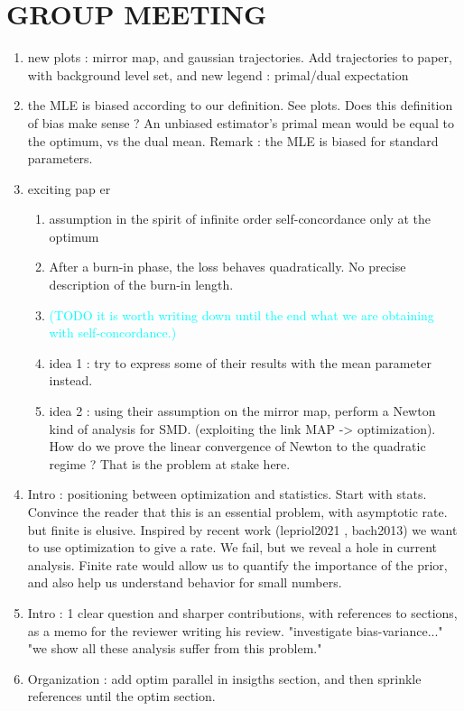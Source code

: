 \documentclass[twoside]{article}
\let\oldsection\section
\renewcommand{\section}[1]{\oldsection{\texorpdfstring{\uppercase{#1}}{#1}}}
\newcommand{\TODO}[1]{\textcolor{cyan}{(TODO #1)}}
\begin{document}
\section{Group Meeting}
\begin{enumerate}
	\item new plots : mirror map, and gaussian trajectories. Add trajectories to paper, with background level set, and new legend : primal/dual expectation
	\item the MLE is biased according to our definition. See plots. Does this definition of bias make sense ? An unbiased estimator's primal mean would be equal to the optimum, vs the dual mean.  Remark : the MLE is biased for standard parameters.
	\item exciting pap er\citet{kakade2010learning}
	\begin{enumerate}
		\item assumption in the spirit of infinite order self-concordance only at the optimum
		\item After a burn-in phase, the loss behaves quadratically. No precise description of the burn-in length.
		\item \TODO{it is worth writing down until the end what we are obtaining with self-concordance.}
		\item idea 1 : try to express some of their results with the mean parameter instead.
		\item idea 2 : using their assumption on the mirror map, perform a Newton kind of analysis for SMD. (exploiting the link MAP -> optimization). How do we prove the linear convergence of Newton to the quadratic regime ? That is the problem at stake here.
	\end{enumerate}
	\item Intro : positioning between optimization and statistics. Start with stats. Convince the reader that this is an essential problem, with asymptotic rate. but finite is elusive. Inspired by recent work (lepriol2021 , bach2013) we want to use optimization to give a rate. We fail, but we reveal a hole in current analysis.  Finite rate would allow us to quantify the importance of the prior, and also help us understand behavior for small numbers.
	\item Intro : 1 clear question and sharper contributions, with references to sections, as a memo for the reviewer writing his review. "investigate bias-variance..." "we show all these analysis suffer from this problem."
	\item Organization : add optim parallel in insigths section, and then sprinkle references until the optim section.

\end{enumerate}
\end{document}
